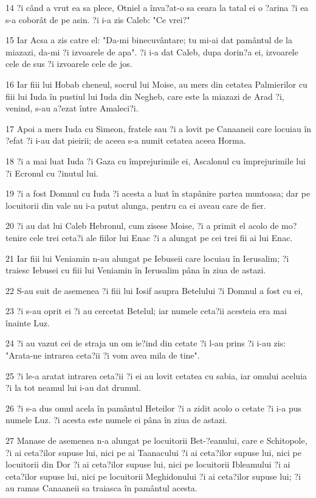 \par 14 ?i când a vrut ea sa plece, Otniel a înva?at-o sa ceara la tatal ei o ?arina ?i ea s-a coborât de pe asin. ?i i-a zis Caleb: "Ce vrei?"
\par 15 Iar Acsa a zis catre el: "Da-mi binecuvântare; tu mi-ai dat pamântul de la miazazi, da-mi ?i izvoarele de apa". ?i i-a dat Caleb, dupa dorin?a ei, izvoarele cele de sus ?i izvoarele cele de jos.
\par 16 Iar fiii lui Hobab cheneul, socrul lui Moise, au mers din cetatea Palmierilor cu fiii lui Iuda în pustiul lui Iuda din Negheb, care este la miazazi de Arad ?i, venind, s-au a?ezat între Amaleci?i.
\par 17 Apoi a mers Iuda cu Simeon, fratele sau ?i a lovit pe Canaaneii care locuiau în ?efat ?i i-au dat pieirii; de aceea s-a numit cetatea aceea Horma.
\par 18 ?i a mai luat Iuda ?i Gaza cu împrejurimile ei, Ascalonul cu împrejurimile lui ?i Ecronul cu ?inutul lui.
\par 19 ?i a fost Domnul cu Iuda ?i acesta a luat în stapânire partea muntoasa; dar pe locuitorii din vale nu i-a putut alunga, pentru ca ei aveau care de fier.
\par 20 ?i au dat lui Caleb Hebronul, cum zisese Moise, ?i a primit el acolo de mo?tenire cele trei ceta?i ale fiilor lui Enac ?i a alungat pe cei trei fii ai lui Enac.
\par 21 Iar fiii lui Veniamin n-au alungat pe Iebuseii care locuiau în Ierusalim; ?i traiesc Iebusei cu fiii lui Veniamin în Ierusalim pâna în ziua de astazi.
\par 22 S-au suit de asemenea ?i fiii lui Iosif asupra Betelului ?i Domnul a fost cu ei,
\par 23 ?i s-au oprit ei ?i au cercetat Betelul; iar numele ceta?ii acesteia era mai înainte Luz.
\par 24 ?i au vazut cei de straja un om ie?ind din cetate ?i l-au prins ?i i-au zis: "Arata-ne intrarea ceta?ii ?i vom avea mila de tine".
\par 25 ?i le-a aratat intrarea ceta?ii ?i ei au lovit cetatea cu sabia, iar omului aceluia ?i la tot neamul lui i-au dat drumul.
\par 26 ?i s-a dus omul acela în pamântul Heteilor ?i a zidit acolo o cetate ?i i-a pus numele Luz. ?i acesta este numele ei pâna în ziua de astazi.
\par 27 Manase de asemenea n-a alungat pe locuitorii Bet-?eanului, care e Schitopole, ?i ai ceta?ilor supuse lui, nici pe ai Taanacului ?i ai ceta?ilor supuse lui, nici pe locuitorii din Dor ?i ai ceta?ilor supuse lui, nici pe locuitorii Ibleamului ?i ai ceta?ilor supuse lui, nici pe locuitorii Meghidonului ?i ai ceta?ilor supuse lui; ?i au ramas Canaaneii sa traiasca în pamântul acesta.
